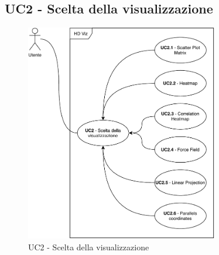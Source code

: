 \subsection{UC2 - Scelta della visualizzazione}
\label{uc2}

    \begin{figure}[htbp]
        \centering
        \includegraphics[width=0.75\textwidth]{source/sections/casi-uso/diagrams/uc2.pdf}
        \caption{UC2 - Scelta della visualizzazione}
        \label{fig:uc2}
    \end{figure}


